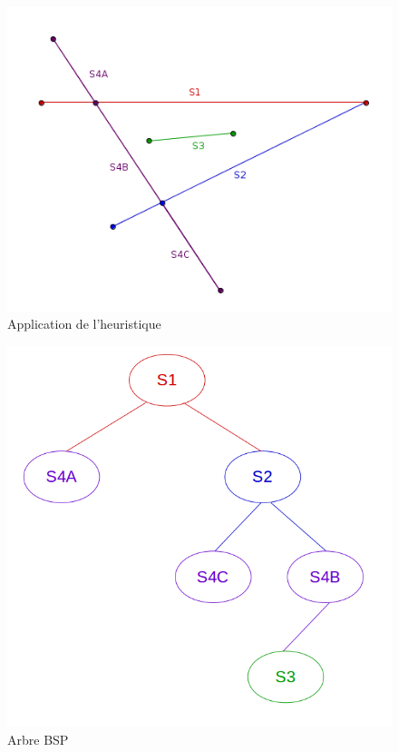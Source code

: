\documentclass[11pt,a4paper]{article}
\begin{document}
\begin{figure}[!h]
\centering
\includegraphics[scale=0.5]{free_splits_1.png}
\caption{Application de l'heuristique}
\label{heuristic_splits}
\end{figure}


\begin{figure}[!h]
\centering
\includegraphics[scale=0.4]{free_splits_3.png}
\caption{Arbre BSP}
\label{split_bsp}
\end{figure}
\end{document}

